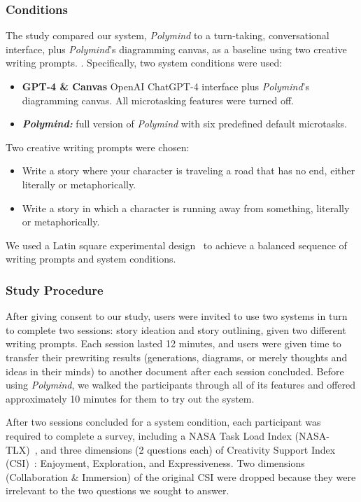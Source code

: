 \subsubsection{Conditions}
The study compared our system, \textit{Polymind} to a turn-taking, conversational interface, plus \textit{Polymind}'s diagramming canvas, as a baseline using two creative writing prompts. . Specifically, two system conditions were used:
\begin{itemize}
    \item \textbf{GPT-4 \& Canvas} OpenAI ChatGPT-4 interface plus \textit{Polymind}'s diagramming canvas. All microtasking features were turned off.
    \item \textbf{\textit{Polymind:}} full version of \textit{Polymind} with six predefined default microtasks.
\end{itemize}
Two creative writing prompts were chosen:
\begin{itemize}
    \item Write a story where your character is traveling a road that has no end, either literally or metaphorically.
    \item Write a story in which a character is running away from something, literally or metaphorically.
\end{itemize}
We used a Latin square experimental design~\cite{ryan2007modern} to achieve a balanced sequence of writing prompts and system conditions.

\subsubsection{Study Procedure}
After giving consent to our study, users were invited to use two systems in turn to complete two sessions: story ideation and story outlining, given two different writing prompts. Each session lasted 12 minutes, and users were given time to transfer their prewriting results (generations, diagrams, or merely thoughts and ideas in their minds) to another document after each session concluded. Before using \textit{Polymind}, we walked the participants through all of its features and offered approximately 10 minutes for them to try out the system.

After two sessions concluded for a system condition, each participant was required to complete a survey, including a NASA Task Load Index (NASA-TLX)~\cite{hart1986nasa}, and three dimensions (2 questions each) of Creativity Support Index (CSI)~\cite{cherry2014quantifying}: Enjoyment, Exploration, and Expressiveness. Two dimensions (Collaboration \& Immersion) of the original CSI were dropped because they were irrelevant to the two questions we sought to answer.

